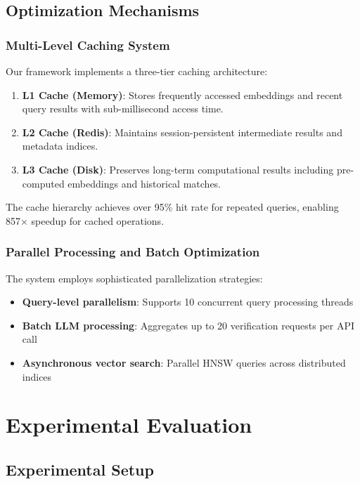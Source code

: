 \documentclass[conference]{IEEEtran}
\begin{document}
\subsection{Optimization Mechanisms}

\subsubsection{Multi-Level Caching System}

Our framework implements a three-tier caching architecture:

\begin{enumerate}
    \item \textbf{L1 Cache (Memory)}: Stores frequently accessed embeddings and recent query results with sub-millisecond access time.
    \item \textbf{L2 Cache (Redis)}: Maintains session-persistent intermediate results and metadata indices.
    \item \textbf{L3 Cache (Disk)}: Preserves long-term computational results including pre-computed embeddings and historical matches.
\end{enumerate}

The cache hierarchy achieves over 95\% hit rate for repeated queries, enabling 857× speedup for cached operations.

\subsubsection{Parallel Processing and Batch Optimization}

The system employs sophisticated parallelization strategies:

\begin{itemize}
    \item \textbf{Query-level parallelism}: Supports 10 concurrent query processing threads
    \item \textbf{Batch LLM processing}: Aggregates up to 20 verification requests per API call
    \item \textbf{Asynchronous vector search}: Parallel HNSW queries across distributed indices
\end{itemize}

\section{Experimental Evaluation}

\subsection{Experimental Setup}
\end{document}
